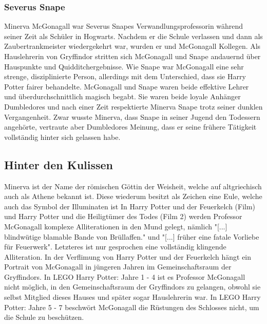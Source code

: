 \documentclass[a4paper, 10pt]{article}
\begin{document}
\subsubsection*{\large Severus Snape}
Minerva McGonagall war Severus Snapes Verwandlungsprofessorin während seiner Zeit als Schüler in Hogwarts. Nachdem er die Schule verlassen und dann als Zaubertrankmeister wiedergekehrt war, wurden er und McGonagall Kollegen. Als Hauslehrerin von Gryffindor stritten sich McGonagall und Snape andauernd über Hauspunkte und Quidditchergebnisse. Wie Snape war McGonagall eine sehr strenge, disziplinierte Person, allerdings mit dem Unterschied, dass sie Harry Potter fairer behandelte. McGonagall und Snape waren beide effektive Lehrer und überdurchschnittlich magisch begabt. Sie waren beide loyale Anhänger Dumbledores und nach einer Zeit respektierte Minerva Snape trotz seiner dunklen Vergangenheit. Zwar wusste Minerva, dass Snape in seiner Jugend den Todessern angehörte, vertraute aber Dumbledores Meinung, dass er seine frühere Tätigkeit vollständig hinter sich gelassen habe. 


\subsection*{\Large Hinter den Kulissen}
Minerva ist der Name der römischen Göttin der Weisheit, welche auf altgriechisch auch als Athene bekannt ist.
Diese wiederum besitzt als Zeichen eine Eule, welche auch das Symbol der Illuminaten ist
In Harry Potter und der Feuerkelch (Film) und Harry Potter und die Heiligtümer des Todes (Film 2) werden Professor McGonagall komplexe Alliterationen in den Mund gelegt, nämlich "[...] blindwütige blamable Bande von Brüllaffen." und "[...] früher eine fatale Vorliebe für Feuerwerk". Letzteres ist nur 
gesprochen eine vollständig klingende Alliteration.
In der Verflimung von Harry Potter und der Feuerkelch hängt ein Portrait von McGonagall in jüngeren Jahren im Gemeinschaftsraum der Gryffindors.
In LEGO Harry Potter: Jahre 1 - 4 ist es Professor McGonagall nicht möglich, in den Gemeinschaftsraum der Gryffindors zu gelangen, obwohl sie selbst Mitglied dieses Hauses und später sogar Hauslehrerin war.
In LEGO Harry Potter: Jahre 5 - 7 beschwört McGonagall die Rüstungen des Schlosses nicht, um die Schule zu beschützen.
\end{document}

